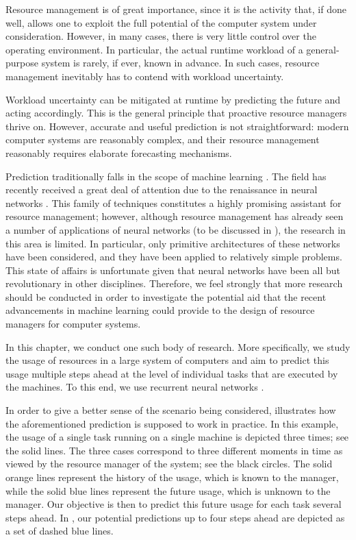 Resource management is of great importance, since it is the activity that, if
done well, allows one to exploit the full potential of the computer system under
consideration. However, in many cases, there is very little control over the
operating environment. In particular, the actual runtime workload of a
general-purpose system is rarely, if ever, known in advance. In such cases,
resource management inevitably has to contend with workload uncertainty.

Workload uncertainty can be mitigated at runtime by predicting the future and
acting accordingly. This is the general principle that proactive resource
managers thrive on. However, accurate and useful prediction is not
straightforward: modern computer systems are reasonably complex, and their
resource management reasonably requires elaborate forecasting mechanisms.

Prediction traditionally falls in the scope of machine learning
\cite{hastie2013}. The field has recently received a great deal of attention due
to the renaissance in neural networks \cite{goodfellow2016}. This family of
techniques constitutes a highly promising assistant for resource management;
however, although resource management has already seen a number of applications
of neural networks (to be discussed in ), the research in this
area is limited. In particular, only primitive architectures of these networks
have been considered, and they have been applied to relatively simple problems.
This state of affairs is unfortunate given that neural networks have been all
but revolutionary in other disciplines. Therefore, we feel strongly that more
research should be conducted in order to investigate the potential aid that the
recent advancements in machine learning could provide to the design of resource
managers for computer systems.

In this chapter, we conduct one such body of research. More specifically, we
study the usage of resources in a large system of computers and aim to predict
this usage multiple steps ahead at the level of individual tasks that are
executed by the machines. To this end, we use recurrent neural networks
\cite{goodfellow2016}.

In order to give a better sense of the scenario being considered,
 illustrates how the aforementioned prediction is
supposed to work in practice. In this example, the  usage of a single
task running on a single machine is depicted three times; see the solid lines.
The three cases correspond to three different moments in time as viewed by the
resource manager of the system; see the black circles. The solid orange lines
represent the history of the usage, which is known to the manager, while the
solid blue lines represent the future usage, which is unknown to the manager.
Our objective is then to predict this future usage for each task several steps
ahead. In , our potential predictions up to four steps
ahead are depicted as a set of dashed blue lines.

